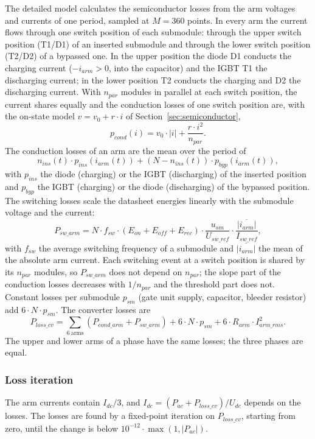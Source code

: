 The detailed model calculates the semiconductor losses from the arm voltages and currents of one period, sampled at
$M = 360$ points. In every arm the current flows through one switch position of each submodule: through the upper
switch position (T1/D1) of an inserted submodule and through the lower switch position (T2/D2) of a bypassed one. In
the upper position the diode D1 conducts the charging current ($-i_{arm} > 0$, into the capacitor) and the IGBT T1
the discharging current; in the lower position T2 conducts the charging and D2 the discharging current. With
$n_{par}$ modules in parallel at each switch position, the current shares equally and the conduction losses of one
switch position are, with the on-state model $v = v_0 + r \cdot i$ of Section~\ref{sec:semiconductor},
\begin{equation}
  p_{cond}(i) = v_0 \cdot |i| + \frac{r \cdot i^2}{n_{par}} .
\end{equation}
The conduction losses of an arm are the mean over the period of
\begin{equation}
  n_{ins}(t) \cdot p_{ins}\!\left( i_{arm}(t) \right) + \left( N - n_{ins}(t) \right) \cdot p_{byp}\!\left( i_{arm}(t) \right) ,
\end{equation}
with $p_{ins}$ the diode (charging) or the IGBT (discharging) of the inserted position and $p_{byp}$ the IGBT
(charging) or the diode (discharging) of the bypassed position. The switching losses scale the datasheet energies
linearly with the submodule voltage and the current:
\begin{equation}
  P_{sw\_arm} = N \cdot f_{sw} \cdot \left( E_{on} + E_{off} + E_{rec} \right) \cdot \frac{u_{sm}}{U_{sw\_ref}}
                \cdot \frac{\overline{|i_{arm}|}}{I_{sw\_ref}} ,
\end{equation}
with $f_{sw}$ the average switching frequency of a submodule and $\overline{|i_{arm}|}$ the mean of the absolute arm
current. Each switching event at a switch position is shared by its $n_{par}$ modules, so $P_{sw\_arm}$ does not
depend on $n_{par}$; the slope part of the conduction losses decreases with $1/n_{par}$ and the threshold part does
not. Constant losses per submodule $p_{sm}$ (gate unit supply, capacitor, bleeder resistor) add $6 \cdot N \cdot p_{sm}$.
The converter losses are
\begin{equation}
  P_{loss\_cv} = \sum_{6\ \mathrm{arms}} \left( P_{cond\_arm} + P_{sw\_arm} \right) + 6 \cdot N \cdot p_{sm}
                 + 6 \cdot R_{arm} \cdot I_{arm\_rms}^2 .
\end{equation}
The upper and lower arms of a phase have the same losses; the three phases are equal.

\subsubsection{Loss iteration}

The arm currents contain $I_{dc} / 3$, and $I_{dc} = (P_{ac} + P_{loss\_cv}) / U_{dc}$ depends on the losses. The
losses are found by a fixed-point iteration on $P_{loss\_cv}$, starting from zero, until the change is below
$10^{-12} \cdot \max(1, |P_{ac}|)$.
